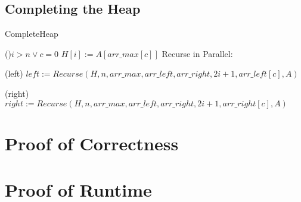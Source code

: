 \documentclass[letterpaper, reqno, 11pt]{article}
\begin{document}
\subsection*{Completing the Heap}
\begin{algorithm}[H]
\caption{CompleteHeap}
\If(){$i>n\lor c=0$}
{
	\;
}
$H[i]:=A[arr\_max[c]]$
Recurse in Parallel:
\begin{description}
	\item{(left)} $left:=Recurse(H, n, arr\_max, arr\_left, arr\_right,
			2i+1, arr\_left[c], A)$\;
	\item{(right)} $right:=Recurse(H, n, arr\_max, arr\_left, arr\_right,
			2i+1, arr\_right[c], A)$\;
\end{description}
\end{algorithm}

\section*{Proof of Correctness}

\section*{Proof of Runtime}
\end{document}
